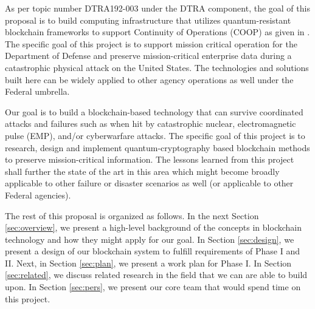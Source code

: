 As per topic number DTRA192-003 under the DTRA component, the goal of this proposal is to build computing infrastructure
that utilizes quantum-resistant blockchain frameworks to support Continuity of Operations (COOP) as given in
\cite{whitworth2006}. The specific goal of this project is to support mission critical operation for the Department of
Defense and preserve mission-critical enterprise data during a catastrophic physical attack on the United States. The
technologies and solutions built here can be widely applied to other agency operations as well under the Federal
umbrella. 

Our goal is to build a blockchain-based technology that can survive coordinated attacks and failures such as when
hit by catastrophic nuclear, electromagnetic pulse (EMP), and/or cyberwarfare attacks. The specific goal of this project
is to research, design and implement quantum-cryptography based blockchain methods to preserve mission-critical
information. The lessons learned from this project shall further the state of the art in this area which might become
broadly applicable to other failure or disaster scenarios as well (or applicable to other Federal agencies).

The rest of this proposal is organized as follows. In the next Section \ref{sec:overview}, we present a high-level
background of the concepts in blockchain technology and how they might apply for our goal. In Section \ref{sec:design},
we present a design of our blockchain system to fulfill requirements of Phase I and II. Next, in Section \ref{sec:plan},
we present a work plan for Phase I. In Section \ref{sec:related}, we discuss related research in the field that we can
are able to build upon. In Section \ref{sec:pers}, we present our core team that would spend time on this project.

